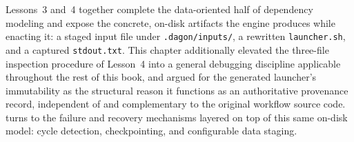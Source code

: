 Lessons~3 and~4 together complete the data-oriented half of dependency
modeling and expose the concrete, on-disk artifacts the engine produces while
enacting it: a staged input file under \texttt{.dagon/inputs/}, a rewritten
\texttt{launcher.sh}, and a captured \texttt{stdout.txt}. This chapter
additionally elevated the three-file inspection procedure of Lesson~4 into a
general debugging discipline applicable throughout the rest of this book,
and argued for the generated launcher's immutability as the structural
reason it functions as an authoritative provenance record, independent of
and complementary to the original workflow source code. 
turns to the failure and recovery mechanisms layered on top of this same
on-disk model: cycle detection, checkpointing, and configurable data staging.
